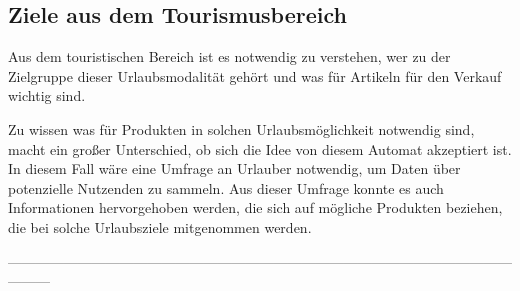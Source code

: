 %
%
%
%
%
\subsection{Ziele aus dem Tourismusbereich}


Aus dem touristischen Bereich ist es notwendig zu verstehen, wer zu der Zielgruppe dieser Urlaubsmodalität gehört
und was für Artikeln für den Verkauf wichtig sind.


Zu wissen was für Produkten in solchen Urlaubsmöglichkeit notwendig sind, macht ein großer Unterschied, ob sich die
Idee von diesem Automat akzeptiert ist. In diesem Fall wäre eine Umfrage an Urlauber notwendig, um Daten über 
potenzielle Nutzenden zu sammeln. Aus dieser Umfrage konnte es auch Informationen hervorgehoben werden, die sich auf
mögliche Produkten beziehen, die bei solche Urlaubsziele mitgenommen werden.

---------------------------------------------------------------------------------------------------------------------